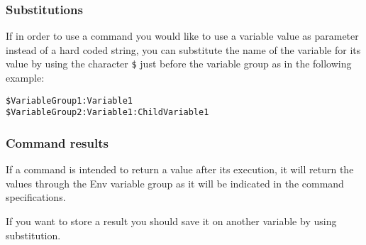 \subsubsection{Substitutions}
If in order to use a command you would like to use a variable value as parameter instead of a hard coded string, you can substitute the name of the variable for its value by using the character \texttt{\$} just before the variable group as in the following example:

\begin{verbatim}
$VariableGroup1:Variable1
$VariableGroup2:Variable1:ChildVariable1
\end{verbatim}

\subsubsection{Command results}
If a command is intended to return a value after its execution, it will return the values through the Env variable group as it will be indicated in the command specifications.

If you want to store a result you should save it on another variable by using substitution.



















